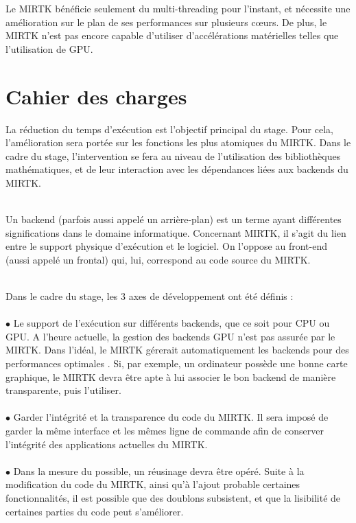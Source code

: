 \documentclass[10pt]{report}
\begin{document}
	Le MIRTK bénéficie seulement du multi-threading pour l'instant, et nécessite une amélioration sur le plan de ses performances sur plusieurs cœurs. De plus,  le MIRTK n'est pas encore capable d'utiliser d'accélérations matérielles telles que l'utilisation de GPU.
	
	\section{Cahier des charges}
	La réduction du temps d'exécution est l'objectif principal du stage. Pour cela, l'amélioration sera portée sur les fonctions les plus atomiques du MIRTK. Dans le cadre du stage, l'intervention se fera au niveau de l'utilisation des bibliothèques mathématiques, et de leur interaction avec les dépendances liées aux backends du MIRTK.\\ ~\par
	
	Un backend (parfois aussi appelé un arrière-plan) est un terme ayant différentes significations dans le domaine informatique. Concernant MIRTK, il s'agit du lien entre le support physique d'exécution et le logiciel. On l'oppose au front-end (aussi appelé un frontal) qui, lui, correspond au code source du MIRTK. \\ ~\par
	
	Dans le cadre du stage, les 3 axes de développement ont été définis : \\
	\\{$\bullet$} Le support de l'exécution sur différents backends, que ce soit pour CPU ou GPU. A l'heure actuelle, la gestion des backends GPU n'est pas assurée par le MIRTK. Dans l'idéal, le MIRTK gérerait automatiquement les backends  pour des performances optimales . Si, par exemple, un ordinateur possède une bonne carte graphique, le MIRTK devra être apte à lui associer le bon backend de manière transparente, puis l'utiliser.\\
	\\{$\bullet$} Garder l'intégrité et la transparence du code du MIRTK. Il sera imposé de garder la même interface et les mêmes ligne de commande afin de conserver l'intégrité des applications actuelles du MIRTK.  \\
	\\{$\bullet$} Dans la mesure du possible, un réusinage devra être opéré. Suite à la modification du code du MIRTK, ainsi qu'à l'ajout probable certaines fonctionnalités, il est possible que des doublons subsistent, et que la lisibilité de certaines parties du code peut s'améliorer.	
\end{document}
